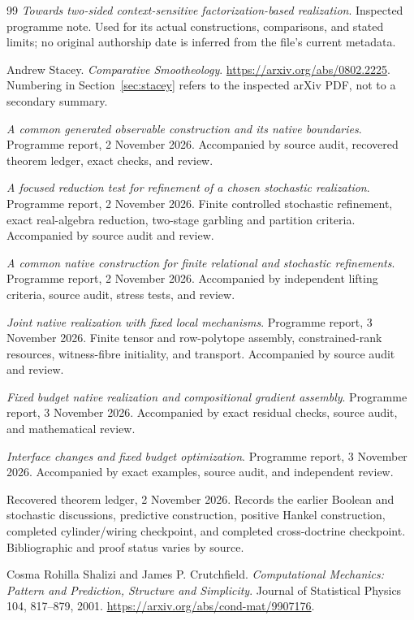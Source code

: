 \documentclass[11pt]{article}
\theoremstyle{remark}
\begin{document}
\begin{thebibliography}{99}
\emph{Towards two-sided context-sensitive factorization-based realization}.
Inspected programme note. Used for its actual constructions, comparisons, and stated limits; no original authorship date is inferred from the file's current metadata.

Andrew Stacey. \emph{Comparative Smootheology}.
\url{https://arxiv.org/abs/0802.2225}.
Numbering in Section~\ref{sec:stacey} refers to the inspected arXiv PDF, not to a secondary summary.

\emph{A common generated observable construction and its native boundaries}.
Programme report, 2 November 2026. Accompanied by source audit, recovered theorem ledger, exact checks, and review.

\emph{A focused reduction test for refinement of a chosen stochastic realization}. Programme report, 2 November 2026.
Finite controlled stochastic refinement, exact real-algebra reduction, two-stage garbling and partition criteria. Accompanied by source audit and review.

\emph{A common native construction for finite relational and stochastic refinements}.
Programme report, 2 November 2026. Accompanied by independent lifting criteria, source audit, stress tests, and review.

\emph{Joint native realization with fixed local mechanisms}.
Programme report, 3 November 2026. Finite tensor and row-polytope assembly, constrained-rank resources, witness-fibre initiality, and transport. Accompanied by source audit and review.

\emph{Fixed budget native realization and compositional gradient assembly}.
Programme report, 3 November 2026. Accompanied by exact residual checks, source audit, and mathematical review.

\emph{Interface changes and fixed budget optimization}.
Programme report, 3 November 2026. Accompanied by exact examples, source audit, and independent review.

Recovered theorem ledger, 2 November 2026.
Records the earlier Boolean and stochastic discussions, predictive construction, positive Hankel construction, completed cylinder/wiring checkpoint, and completed cross-doctrine checkpoint. Bibliographic and proof status varies by source.

Cosma Rohilla Shalizi and James P. Crutchfield.
\emph{Computational Mechanics: Pattern and Prediction, Structure and Simplicity}.
Journal of Statistical Physics 104, 817--879, 2001.
\url{https://arxiv.org/abs/cond-mat/9907176}.


\end{thebibliography}
\end{document}
